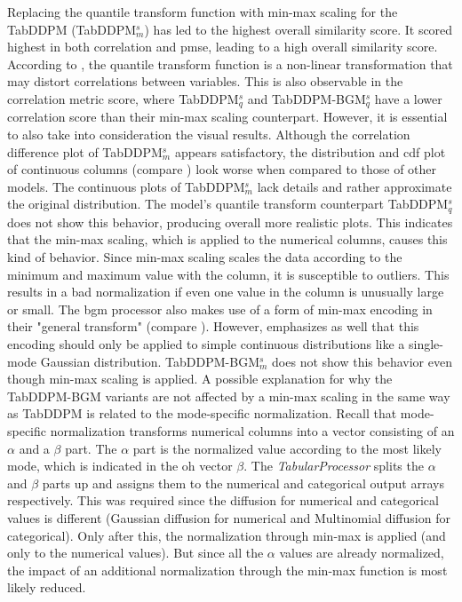 Replacing the quantile transform function with min-max scaling for the TabDDPM (TabDDPM$^{s}_m$) has led to the highest overall similarity score.
It scored highest in both correlation and \gls{pmse}, leading to a high overall similarity score.
According to \cite{scikit-learndevelopers2023QuantileTransformer}, the quantile transform function is a non-linear transformation that may distort correlations between variables.
This is also observable in the correlation metric score, where TabDDPM$^{s}_q$ and TabDDPM-BGM$^{s}_q$ have a lower correlation score than their min-max scaling counterpart.
However, it is essential to also take into consideration the visual results.
Although the correlation difference plot of TabDDPM$^{s}_m$ appears satisfactory, the distribution and \gls{cdf} plot of continuous columns (compare ) look worse when compared to those of other models.
The continuous plots of TabDDPM$^{s}_m$ lack details and rather approximate the original distribution.
The model's quantile transform counterpart TabDDPM$^{s}_q$ does not show this behavior, producing overall more realistic plots.
This indicates that the min-max scaling, which is applied to the numerical columns, causes this kind of behavior.
Since min-max scaling scales the data according to the minimum and maximum value with the column, it is susceptible to outliers.
This results in a bad normalization if even one value in the column is unusually large or small.
The \gls{bgm} processor also makes use of a form of min-max encoding in their "general transform" \cite[p. 7]{zhao2022CTABGANEnhancingTabular} (compare ).
However, \textcite{zhao2022CTABGANEnhancingTabular} emphasizes as well that this encoding should only be applied to simple continuous distributions like a single-mode Gaussian distribution.
TabDDPM-BGM$^{s}_m$ does not show this behavior even though min-max scaling is applied.
A possible explanation for why the TabDDPM-BGM variants are not affected by a min-max scaling in the same way as TabDDPM is related to the mode-specific normalization.
Recall that mode-specific normalization transforms numerical columns into a vector consisting of an $\alpha$ and a $\beta$ part.
The $\alpha$ part is the normalized value according to the most likely mode, which is indicated in the \gls{oh} vector $\beta$.
The \textit{TabularProcessor} splits the $\alpha$ and $\beta$ parts up and assigns them to the numerical and categorical output arrays respectively.
This was required since the diffusion for numerical and categorical values is different (Gaussian diffusion for numerical and Multinomial diffusion for categorical).
Only after this, the normalization through min-max is applied (and only to the numerical values). 
But since all the $\alpha$ values are already normalized, the impact of an additional normalization through the min-max function is most likely reduced.

